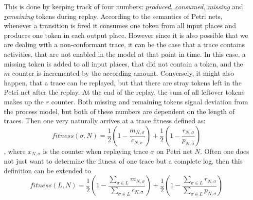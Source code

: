 \documentclass[runningheads]{template/llncs}
\begin{document}
This is done by keeping track of four numbers: \emph{\underline{p}roduced}, \emph{\underline{c}onsumed}, \emph{\underline{m}issing} and \emph{\underline{r}emaining} tokens during replay.
According to the semantics of Petri nets, whenever a transition is fired it consumes one token from all input places and produces one token in each output place.
However since it is also possible that we are dealing with a non-conformant trace, it can be the case that a trace contains activities, that are not enabled in the model at that point in time.
In this case, a missing token is added to all input places, that did not contain a token, and the $m$ counter is incremented by the according amount.
Conversely, it might also happen, that a trace can be replayed, but that there are stray tokens left in the Petri net after the replay. 
At the end of the replay, the sum of all leftover tokens makes up the $r$ counter.
Both missing and remaining tokens signal deviation from the process model, but both of these numbers are dependent on the length of traces.
Then one very naturally arrives at a trace fitness defined as:
\begin{equation}
	fitness(\sigma,N) = \frac{1}{2}(1-\frac{m_{N,\sigma}}{c_{N,\sigma}})+\frac{1}{2}(1-\frac{r_{N,\sigma}}{p_{N,\sigma}})
\end{equation}
, where $x_{N,\sigma}$ is the counter when replaying trace $\sigma$ on Petri net $N$.
Often one does not just want to determine the fitness of one trace but a complete log, then this definition can be extended to 
\begin{equation}
	fitness(L,N) = \frac{1}{2}(1-\frac{\sum_{\sigma\in L}m_{N,\sigma}}{\sum_{\sigma\in L}c_{N,\sigma}})+\frac{1}{2}(1-\frac{\sum_{\sigma\in L}r_{N,\sigma}}{\sum_{\sigma\in L}p_{N,\sigma}})
\end{equation}
\end{document}
